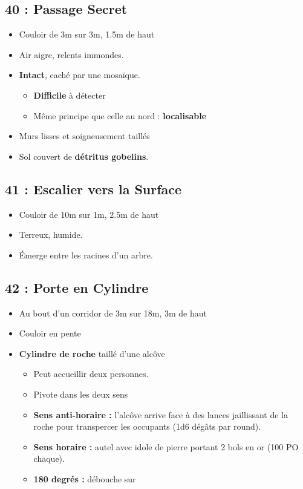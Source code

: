 \vfill
\pagebreak
\subsection{40 : Passage Secret}\label{n3:s40}
\begin{itemize}
  \item Couloir de 3m sur 3m, 1.5m de haut
  \item Air aigre, relents immondes.
  \item \textbf{Intact}, caché par une mosaïque.
  \begin{itemize}
    \item \textbf{Difficile} à détecter
    \item Même principe que celle au nord : \textbf{localisable}
  \end{itemize}
  \item Murs lisses et soigneusement taillés
  \item Sol couvert de \textbf{ détritus gobelins}.
\end{itemize}

\subsection{41 : Escalier vers la Surface}\label{n3:s41}
\begin{itemize}
  \item Couloir de 10m sur 1m, 2.5m de haut
  \item Terreux, humide. 
  \item Émerge entre les racines d’un arbre.
\end{itemize}

\subsection{42 : Porte en Cylindre}\label{n3:s42}
  \begin{itemize}
    \item Au bout d’un corridor de 3m sur 18m, 3m de haut
    \item Couloir en pente
    \item \textbf{Cylindre de roche} taillé d’une alcôve
    \begin{itemize}
      \item Peut accueillir deux personnes. 
      \item Pivote dans les deux sens
      \item \textbf{Sens anti-horaire :} l’alcôve arrive face à des lances jaillissant de la roche
      pour transpercer les occupants (1d6 dégâts par round). 
      \item \textbf{Sens horaire :} autel avec idole de pierre portant 2 bols en or (100 PO chaque).
      \item \textbf{180 degrés :} débouche sur 
    \end{itemize}
\end{itemize}


